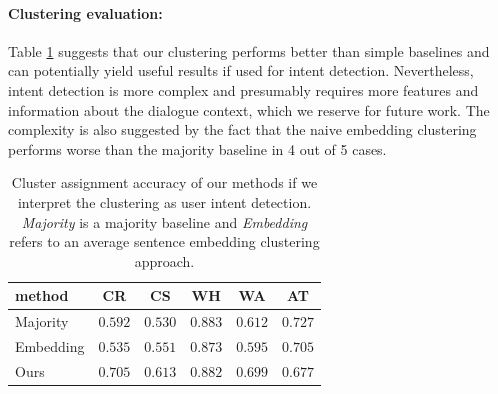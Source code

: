 \paragraph{Clustering evaluation:} 
Table \ref{table:intentclust} suggests that our clustering performs better than simple baselines and can potentially yield useful results if used for intent detection.
Nevertheless, intent detection is more complex and presumably requires more features and information about the dialogue context, which we reserve for future work.
The complexity is also suggested by the fact that the naive embedding clustering performs worse than the majority baseline in 4 out of 5 cases.
\begin{table}[h]
    \centering
    \small
    \begin{tabular}{lccccc}
    \hline
     \textbf{method} & \textbf{CR} & \textbf{CS} & \textbf{WH} & \textbf{WA} & \textbf{AT} \\
     \hline
     Majority & $0.592$ & $0.530$ & $0.883$ & $0.612$ & $\pmb{0.727}$ \\
     Embedding & $0.535$ & $0.551$ & $0.873$ & $0.595$ & $0.705$ \\
     Ours & $\pmb{0.705}$ & $\pmb{0.613}$ & $\pmb{0.882}$ & $\pmb{0.699}$ & $0.677$ \\
     \hline
    \end{tabular}
    
    \caption{Cluster assignment accuracy of our methods if we interpret the clustering as user intent detection. \textit{Majority} is a majority baseline and \textit{Embedding} refers to an average sentence embedding clustering approach.
    }
    \label{table:intentclust}
\end{table}


